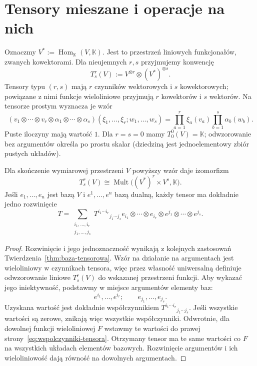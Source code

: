 \section{Tensory mieszane i operacje na nich}
\label{sec:operacje-tensorowe}

Oznaczmy $V^*:=\operatorname{Hom}_{\mathbb K}(V,\mathbb K)$.
Jest to przestrzeń liniowych funkcjonałów, zwanych kowektorami.
Dla nieujemnych $r,s$ przyjmujemy konwencję
\begin{equation}\label{eq:typ-tensora}
 T^r_s(V):=V^{\otimes r}\otimes(V^*)^{\otimes s}.
\end{equation}
Tensory typu $(r,s)$ mają $r$ czynników wektorowych i $s$
kowektorowych; powiązane z nimi funkcje wieloliniowe
przyjmują $r$ kowektorów i $s$ wektorów. Na tensorze prostym
wyznacza je wzór
\[
 (v_1\otimes\cdots\otimes v_r\otimes
 \alpha_1\otimes\cdots\otimes\alpha_s)
 (\xi_1,\ldots,\xi_r;w_1,\ldots,w_s)
 =\prod_{a=1}^r\xi_a(v_a)\prod_{b=1}^s\alpha_b(w_b).
\]
Puste iloczyny mają wartość $1$. Dla $r=s=0$ mamy
$T^0_0(V)=\mathbb K$; odwzorowanie bez argumentów określa po prostu
skalar (dziedziną jest jednoelementowy zbiór pustych układów).

\begin{twierdzenie}
\label{thm:tensor-wieloliniowy}
Dla skończenie wymiarowej przestrzeni $V$ powyższy wzór daje
izomorfizm
\[
 T^r_s(V)\cong
 \operatorname{Mult}\bigl((V^*)^r\times V^s,\mathbb K\bigr).
\]
Jeśli $e_1,\ldots,e_n$ jest bazą $V$ i $e^1,\ldots,e^n$
bazą dualną, każdy tensor ma dokładnie jedno rozwinięcie
\begin{equation}\label{eq:wspolczynniki-tensora}
 T=\sum_{\substack{i_1,\ldots,i_r\\j_1,\ldots,j_s}}
 T^{i_1\cdots i_r}{}_{j_1\cdots j_s}
 e_{i_1}\otimes\cdots\otimes e_{i_r}
 \otimes e^{j_1}\otimes\cdots\otimes e^{j_s}.
\end{equation}
\end{twierdzenie}
\begin{proof}
Rozwinięcie i jego jednoznaczność wynikają z kolejnych
zastosowań Twierdzenia~\ref{thm:baza-tensorowa}. Wzór
na działanie na argumentach jest wieloliniowy w czynnikach
tensora, więc przez własność uniwersalną definiuje odwzorowanie liniowe
$T^r_s(V)$ do wskazanej przestrzeni funkcji. Aby wykazać jego
iniektywność, podstawmy w miejsce argumentów elementy baz:
\[
 e^{i_1},\ldots,e^{i_r};\qquad e_{j_1},\ldots,e_{j_s}.
\]
Uzyskana wartość jest dokładnie współczynnikiem
$T^{i_1\cdots i_r}{}_{j_1\cdots j_s}$. Jeśli wszystkie wartości
są zerowe, znikają więc wszystkie współczynniki.
Odwrotnie, dla dowolnej funkcji wieloliniowej $F$ wstawmy te
wartości do prawej strony~\eqref{eq:wspolczynniki-tensora}.
Otrzymany tensor ma te same wartości co $F$ na wszystkich
układach elementów bazowych. Rozwinięcie argumentów i ich
wieloliniowość dają równość na dowolnych argumentach.
\end{proof}

